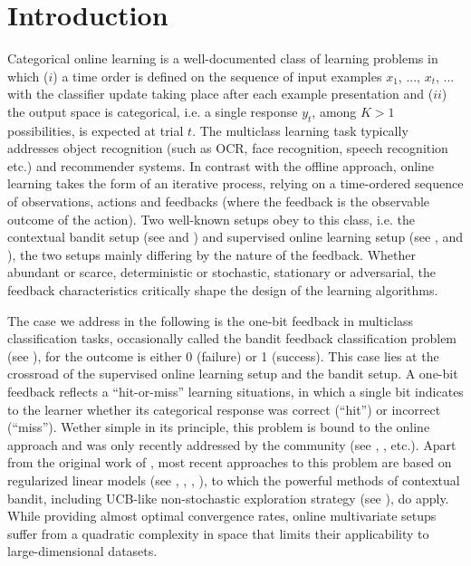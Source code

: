 \documentclass[preprint,12pt,authoryear]{elsarticle}
\begin{document}

\section{Introduction}
\label{sec:lentete}


Categorical online learning is a well-documented class of learning problems in which ($i$) a time order is defined on the sequence of input examples  $x_1$, ..., $x_t$, ... with the classifier update taking place after each example presentation and ($ii$) the output space is categorical, i.e. a single response $y_t$, among $K>1$ possibilities, is expected at trial $t$. The multiclass learning task typically addresses object recognition (such as OCR, face recognition, speech recognition etc.) and recommender systems. In contrast with the offline approach, online learning takes the form of an iterative process, relying on a time-ordered sequence of observations, actions and feedbacks (where the feedback is the observable outcome of the action).   
Two well-known setups obey to this class, i.e. the contextual bandit setup (see  \cite{lai1985asymptotically} and \cite{auer2002finite}) and supervised online learning setup (see  \cite{rosenblatt1958perceptron}, \cite{duda1973pattern} and \cite{freund1999large}), the two setups mainly differing by the nature of the feedback. Whether abundant or scarce, deterministic or stochastic, stationary or adversarial, the feedback characteristics critically shape the design of the learning algorithms.  

The case we address in the following is the one-bit feedback in multiclass classification tasks, occasionally called the bandit feedback classification problem (see \cite{kakade2008efficient}), for the outcome is either 0 (failure) or 1 (success). This case lies at the crossroad of the supervised online learning setup and the bandit setup.  A one-bit feedback reflects a ``hit-or-miss'' learning situations, in which a single bit indicates to the learner whether its categorical response was correct (``hit'') or incorrect (``miss''). Wether simple in its principle, this problem is bound to the online approach and was only recently addressed by the community (see \cite{kakade2008efficient}, \cite{crammer2013multiclass}, etc.). 
Apart from the original work of \cite{kakade2008efficient}, most recent approaches to this problem are based on regularized linear models (see \cite{li2010contextual}, \cite{hazan2011newtron}, \cite{crammer2013multiclass}, \cite{ngo2013upper}), to which the powerful methods of contextual bandit, including UCB-like non-stochastic exploration strategy (see \cite{lai1985asymptotically}), do apply. While providing almost optimal convergence rates, online multivariate setups suffer from a quadratic complexity in space that limits their applicability to large-dimensional datasets.  
\end{document}
